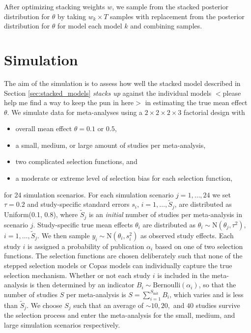 \documentclass[12pt]{article}   	%
\numberwithin{equation}{section}
\begin{document}
After optimizing stacking weights $w$, we sample from the stacked posterior distribution for $\theta$ by taking $w_k \times T$ samples with replacement from the posterior distribution for $\theta$ for model each model $k$ and combining samples. 

\section{Simulation} \label{sec:simulation}

The aim of the simulation is to assess how well the stacked model described in Section \ref{sec:stacked_models} \textit{stacks up} against the individual models $<$please help me find a way to keep the pun in here$>$ in estimating the true mean effect $\theta$. We simulate data for meta-analyses using a $2\times 2 \times 2 \times 3$ factorial design with 
\begin{itemize}
\item{overall mean effect $\theta = 0.1$ or $0.5$,}
\item{a small, medium, or large amount of studies per meta-analysis,}
\item{two complicated selection functions, and}
\item{a moderate or extreme level of selection bias for each selection function,}
\end{itemize}
for 24 simulation scenarios. For each simulation scenario $j = 1, \dots, 24$ we set $\tau = 0.2$ and study-specific standard errors $s_{i}$, $i = 1, \dots, \widetilde{S}_j$, are distributed as Uniform(0.1, 0.8), where $\widetilde{S}_j$ is an \textit{initial} number of studies per meta-analysis in scenario $j$. Study-specific true mean effects $\theta_{i}$ are distributed as $\theta_{i} \sim \text{N}(\theta_j, \tau^2)$, $i = 1, \dots, \widetilde{S}_j$. We then sample $y_{i} \sim \text{N}(\theta_i, s_i^2)$ as observed study effects. Each study $i$ is assigned a probability of publication $\alpha_i$ based on one of two selection functions. The selection functions are chosen deliberately such that none of the stepped selection models or Copas models can individually capture the true selection mechanism. Whether or not each study $i$ is included in the meta-analysis is then determined by an indicator $B_i \sim \text{Bernoulli}(\alpha_i)$, so that the number of studies $S$ per meta-analysis is $S = \sum_{i=1}^{S_{\text{init}}} B_i$, which varies and is less than $\widetilde{S}_j$. We choose $S_j$ such that an average of $\sim 10, 20,$ and $40$ studies survive the selection process and enter the meta-analysis for the small, medium, and large simulation scenarios respectively. 
\end{document}
